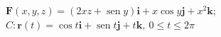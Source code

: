 \item $\mathbf{F}(x,y,z) = (2xz + \operatorname{sen} y)\mathbf{i} + x \cos y\mathbf{j} + x^2\mathbf{k}$; $C: \mathbf{r}(t) = \cos t\mathbf{i} + \operatorname{sen} t\mathbf{j} + t\mathbf{k}, \ 0 \le t \le 2\pi$
